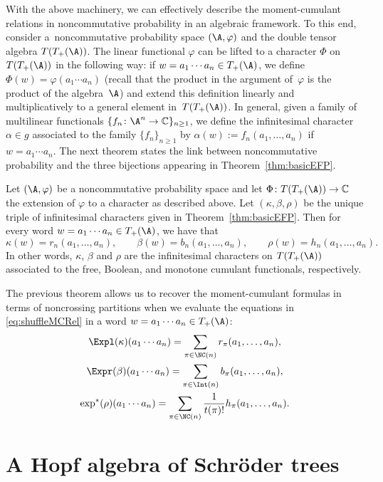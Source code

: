  With the above machinery, we can effectively describe the moment-cumulant relations in noncommutative probability in an algebraic framework. To this end, consider a~noncommutative probability space $(\A,\varphi)$ and the double tensor algebra $T(T_+(\A))$. The linear functional $\varphi$ can be lifted to a character $\Phi$ on $T(T_+(\A))$ in the following way: if $w = a_1\cdots a_n \in T_+(\A)$, we define $\Phi(w) = \varphi(a_1\cdots a_n)$ (recall that the product in the argument of~$\varphi$ is the product of the algebra~$\A$) and extend this definition linearly and multiplicatively to a general element in~$T(T_+(\A))$. In general, given a family of multilinear functionals $\{f_n\colon \A^n\to \mathbb{C} \}_{n\geq1}$, we define the infinitesimal character~$\alpha \in g$ associated to the family $\{f_n\}_{n\geq1}$ by $\alpha(w) := f_n(a_1,\dots,a_n)$ if $w= a_1\cdots a_n$. The next theorem states the link between noncommutative probability and the three bijections appearing in Theorem~\ref{thm:basicEFP}.

\begin{Theorem}\label{thm:linkNCP}
Let $(\A,\varphi)$ be a noncommutative probability space and let $\Phi\colon T(T_+(\A)) \allowbreak \to \mathbb{C}$ the extension of $\varphi$ to a character as described above. Let $(\kappa,\beta,\rho)$ be the unique triple of infinitesimal characters given in Theorem~{\rm \ref{thm:basicEFP}}. Then for every word $w = a_1\cdots a_n \in T_+(\A)$, we have that
\[
	\kappa(w) = r_n(a_1,\dots,a_n),
	\qquad
	\beta(w) = b_n(a_1,\dots,a_n),
	\qquad
	\rho(w) = h_n(a_1,\dots,a_n).
\]
In other words, $\kappa$, $\beta$ and $\rho$ are the infinitesimal characters on $T(T_+(\A))$ associated to the free, Boolean, and monotone cumulant functionals, respectively.
\end{Theorem}
The previous theorem allows us to recover the moment-cumulant formulas in terms of noncrossing partitions when we evaluate the equations in \eqref{eq:shuffleMCRel} in a word $w= a_1\cdots a_n\in T_+(\A)$:
\begin{gather*}
	\Expl(\kappa)(a_1\cdots a_n)
	= \sum_{\pi\in \NC(n)} r_\pi(a_1,\dots,a_n),\\
	\Expr(\beta)(a_1\cdots a_n)
	= \sum_{\pi\in \Int(n)} b_\pi(a_1,\dots,a_n),\\
	\exp^*(\rho)(a_1\cdots a_n)
	= \sum_{\pi\in \NC(n)} \frac{1}{t(\pi)!}h_\pi(a_1,\dots,a_n).
\end{gather*}


\section{A Hopf algebra of Schr\"oder trees}\label{sec:schroder}

